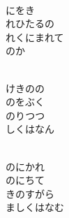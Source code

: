 \documentclass[10pt,b5j]{tarticle} %
\begin{document}
\begin{enumerate}
\begin{minipage}[c]{\blocksize}
        \vspace{\linespace}
        \item~\\
        にをき\\
        れひたるの\\
        れくにまれて\\
        のか
        
        \vspace{\linespace}
        \item~\\
        けきのの\\
        のをぶく\\
        のりつつ\\
        しくはなん
        
        \vspace{\linespace}
        \item~\\
        のにかれ\\
        のにちて\\
        きのすがら\\
        ましくはなむ
    
    \end{minipage}
\end{enumerate} %
\end{document}
